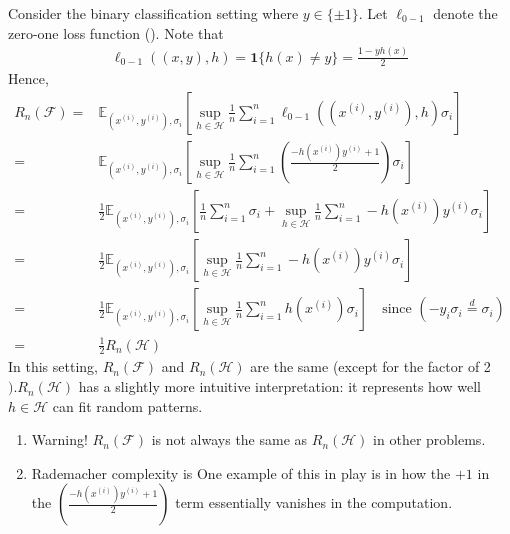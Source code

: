\documentclass{article}
\begin{document}
\begin{exma}
Consider the binary classification setting where $y \in\{\pm 1\} .$ Let $\ell_{0-1}$ denote the zero-one loss function (). Note that
\begin{align*}
\ell_{0-1}((x, y), h)=\mathbf{1}\{h(x) \neq y\}=\frac{1-y h(x)}{2}
\end{align*}
Hence,
\begin{align*}
R_{n}(\mathcal{F})=& \mathbb{E}_{\left(x^{(i)}, y^{(i)}\right), \sigma_{i}}\left[\sup _{h \in \mathcal{H}} \frac{1}{n} \sum_{i=1}^{n} \ell_{0-1}\left(\left(x^{(i)}, y^{(i)}\right), h\right) \sigma_{i}\right] \\
=& \mathbb{E}_{\left(x^{(i)}, y^{(i)}\right), \sigma_{i}}\left[\sup _{h \in \mathcal{H}} \frac{1}{n} \sum_{i=1}^{n}\left(\frac{-h\left(x^{(i)}\right) y^{(i)}+1}{2}\right) \sigma_{i}\right] \\
=&\frac{1}{2} \mathbb{E}_{\left(x^{(i)}, y^{(i)}\right), \sigma_{i}} \left[\frac{1}{n} \sum_{i=1}^{n} \sigma_{i}+\sup _{h \in \mathcal{H}} \frac{1}{n} \sum_{i=1}^{n}-h\left(x^{(i)}\right) y^{(i)} \sigma_{i}\right] \\
=&\frac{1}{2} \mathbb{E}_{\left(x^{(i)}, y^{(i)}\right), \sigma_{i}}\left[\sup _{h \in \mathcal{H}} \frac{1}{n} \sum_{i=1}^{n}-h\left(x^{(i)}\right) y^{(i)} \sigma_{i}\right] \\
=&\frac{1}{2} \mathbb{E}_{\left(x^{(i)}, y^{(i)}\right), \sigma_{i}} \left[\sup _{h \in \mathcal{H}} \frac{1}{n} \sum_{i=1}^{n} h\left(x^{(i)}\right) \sigma_{i}\right] \quad \text{since  $\left(-y_{i} \sigma_{i} \stackrel{d}{=} \sigma_{i}\right)$}\\
=&\frac{1}{2} R_{n}(\mathcal{H}) 
\end{align*}
In this setting, $R_{n}(\mathcal{F})$ and $R_{n}(\mathcal{H})$ are the same (except for the factor of 2$) . R_{n}(\mathcal{H})$ has a slightly more intuitive interpretation: it represents how well $h \in \mathcal{H}$ can fit random patterns.
\end{exma} 
\begin{rema}\text{ \\}
\begin{enumerate}
    \item Warning! $R_{n}(\mathcal{F})$ is not always the same as $R_{n}(\mathcal{H})$ in other problems.
    \item Rademacher complexity is  One example of this in play is in how the $+1$ in the $\left(\frac{-h\left(x^{(i)}\right) y^{(i)}+1}{2}\right)$ term essentially vanishes in the computation.
\end{enumerate}
\end{rema}
\end{document}
